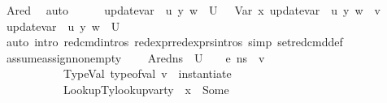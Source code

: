 \begin{isabellebody}
\ Ared\ \isamarkupfalse%
\ auto\isanewline
\ \ \ \ \isamarkupfalse%
\ {\isacartoucheopen}update{\isacharunderscore}{\kern0pt}var\ {\isasymLambda}\ u{\isacharprime}{\kern0pt}\ y\ w\ {\isasymin}\ U{\isacartoucheclose}\ {\isacartoucheopen}{\isasymLambda}{\isacharcomma}{\kern0pt}{\isasymGamma}{\isacharcomma}{\kern0pt}{\isasymOmega}\ {\isasymturnstile}\ {\isasymlangle}Var\ x{\isacharcomma}{\kern0pt}\ {\isacharparenleft}{\kern0pt}update{\isacharunderscore}{\kern0pt}var\ {\isasymLambda}\ u{\isacharprime}{\kern0pt}\ y\ w{\isacharparenright}{\kern0pt}{\isasymrangle}\ {\isasymDown}\ v{\isacartoucheclose}\ \isamarkupfalse%
\ {\isachardoublequoteopen}update{\isacharunderscore}{\kern0pt}var\ {\isasymLambda}\ u{\isacharprime}{\kern0pt}\ y\ w\ {\isasymin}\ {\isacharquery}{\kern0pt}U{\isacharprime}{\kern0pt}{\isachardoublequoteclose}\isanewline
\ \ \ \ \ \ \isamarkupfalse%
\ {\isacharparenleft}{\kern0pt}auto\ intro{\isacharbang}{\kern0pt}{\isacharcolon}{\kern0pt}\ red{\isacharunderscore}{\kern0pt}cmd{\isachardot}{\kern0pt}intros\ red{\isacharunderscore}{\kern0pt}expr{\isacharunderscore}{\kern0pt}red{\isacharunderscore}{\kern0pt}exprs{\isachardot}{\kern0pt}intros\ simp{\isacharcolon}{\kern0pt}\ set{\isacharunderscore}{\kern0pt}red{\isacharunderscore}{\kern0pt}cmd{\isacharunderscore}{\kern0pt}def{\isacharparenright}{\kern0pt}\isanewline
\ \ \isamarkupfalse%
\isanewline
{}\isamarkupfalse%
%
\endisatagproof
{\isafoldproof}%
%
\isadelimproof
\isanewline
%
\endisadelimproof
\isanewline
{}\isamarkupfalse%
\ assume{\isacharunderscore}{\kern0pt}assign{\isacharunderscore}{\kern0pt}non{\isacharunderscore}{\kern0pt}empty{\isacharcolon}{\kern0pt}\isanewline
\ \ \ \ Ared{\isacharcolon}{\kern0pt}{\isachardoublequoteopen}{\isasymforall}ns{\isacharprime}{\kern0pt}\ {\isasymin}\ U{\isachardot}{\kern0pt}\ \ {\isasymLambda}{\isacharcomma}{\kern0pt}{\isasymGamma}{\isacharcomma}{\kern0pt}{\isasymOmega}\ {\isasymturnstile}\ {\isasymlangle}e{}{\isacharcomma}{\kern0pt}\ ns{\isacharprime}{\kern0pt}{\isasymrangle}\ {\isasymDown}\ v{\isachardoublequoteclose}\ \isanewline
\ \ \ \ \ \ \ \ \ \ \ TypeVal{\isacharcolon}{\kern0pt}\ {\isachardoublequoteopen}type{\isacharunderscore}{\kern0pt}of{\isacharunderscore}{\kern0pt}val\ v\ {\isacharequal}{\kern0pt}\ instantiate\ {\isasymOmega}\ {\isasymtau}{\isachardoublequoteclose}\ \isanewline
\ \ \ \ \ \ \ \ \ \ \ LookupTy{\isacharcolon}{\kern0pt}{\isachardoublequoteopen}lookup{\isacharunderscore}{\kern0pt}var{\isacharunderscore}{\kern0pt}ty\ {\isasymLambda}\ x\ {\isacharequal}{\kern0pt}\ Some\ {\isasymtau}{\isachardoublequoteclose}\isanewline

\end{isabellebody}
